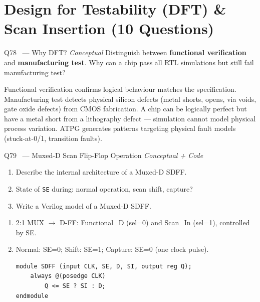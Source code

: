 \documentclass[12pt,a4paper]{article}
\newcommand{\advanced}{%
  \fbox{\textcolor{advred}{\bfseries\sffamily\small ADVANCED}}}
\newcommand{\moderate}{%
  \fbox{\textcolor{modoran}{\bfseries\sffamily\small MODERATE}}}
\begin{document}
\section{Design for Testability (DFT) \& Scan Insertion (10 Questions)}
\label{sec:dft}

\begin{questionbox}{Q78 \moderate\ --- Why DFT? \hfill\textit{Conceptual}}
Distinguish between \textbf{functional verification} and \textbf{manufacturing test}. Why can a chip pass all RTL simulations but still fail manufacturing test?
\end{questionbox}

\begin{answerbox}
Functional verification confirms logical behaviour matches the specification. Manufacturing test detects physical silicon defects (metal shorts, opens, via voids, gate oxide defects) from CMOS fabrication. A chip can be logically perfect but have a metal short from a lithography defect --- simulation cannot model physical process variation. ATPG generates patterns targeting physical fault models (stuck-at-0/1, transition faults).
\end{answerbox}

\begin{questionbox}{Q79 \advanced\ --- Muxed-D Scan Flip-Flop Operation \hfill\textit{Conceptual + Code}}
\begin{enumerate}[label=\textbf{\alph*)}]
  \item Describe the internal architecture of a Muxed-D SDFF.
  \item State of \texttt{SE} during: normal operation, scan shift, capture?
  \item Write a Verilog model of a Muxed-D SDFF.
\end{enumerate}
\end{questionbox}

\begin{answerbox}
\begin{enumerate}[label=\textbf{\alph*)}]
  \item 2:1 MUX $\to$ D-FF: Functional\_D (sel=0) and Scan\_In (sel=1), controlled by SE.
  \item Normal: SE=0; Shift: SE=1; Capture: SE=0 (one clock pulse).
\begin{lstlisting}[style=verilogstyle]
module SDFF (input CLK, SE, D, SI, output reg Q);
    always @(posedge CLK)
        Q <= SE ? SI : D;
endmodule
\end{lstlisting}
\end{enumerate}
\end{answerbox}
\end{document}
